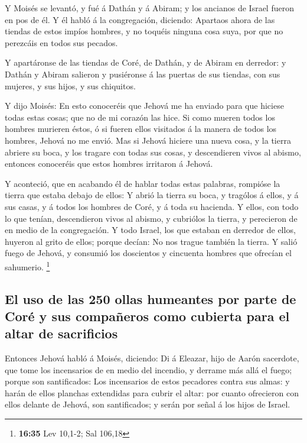  Y Moisés se levantó, y fué á Dathán y á Abiram; y los
ancianos de Israel fueron en pos de él.  Y él habló á la
congregación, diciendo: Apartaos ahora de las tiendas de estos impíos
hombres, y no toquéis ninguna cosa suya, por que no perezcáis en todos
sus pecados.

 Y apartáronse de las tiendas de Coré, de Dathán, y de
Abiram en derredor: y Dathán y Abiram salieron y pusiéronse á las
puertas de sus tiendas, con sus mujeres, y sus hijos, y sus chiquitos.

 Y dijo Moisés: En esto conoceréis que Jehová me ha enviado
para que hiciese todas estas cosas; que no de mi corazón las hice.
 Si como mueren todos los hombres murieren éstos, ó si
fueren ellos visitados á la manera de todos los hombres, Jehová no me
envió.  Mas si Jehová hiciere una nueva cosa, y la tierra
abriere su boca, y los tragare con todas sus cosas, y descendieren vivos
al abismo, entonces conoceréis que estos hombres irritaron á Jehová.

 Y aconteció, que en acabando él de hablar todas estas
palabras, rompióse la tierra que estaba debajo de ellos:  Y
abrió la tierra su boca, y tragólos á ellos, y á sus casas, y á todos
los hombres de Coré, y á toda su hacienda.  Y ellos, con
todo lo que tenían, descendieron vivos al abismo, y cubriólos la tierra,
y perecieron de en medio de la congregación.  Y todo
Israel, los que estaban en derredor de ellos, huyeron al grito de ellos;
porque decían: No nos trague también la tierra.  Y salió
fuego de Jehová, y consumió los doscientos y cincuenta hombres que
ofrecían el sahumerio. \footnote{\textbf{16:35} Lev 10,1-2; Sal 106,18}

\hypertarget{el-uso-de-las-250-ollas-humeantes-por-parte-de-coruxe9-y-sus-compauxf1eros-como-cubierta-para-el-altar-de-sacrificios}{%
\subsection{El uso de las 250 ollas humeantes por parte de Coré y sus
compañeros como cubierta para el altar de
sacrificios}\label{el-uso-de-las-250-ollas-humeantes-por-parte-de-coruxe9-y-sus-compauxf1eros-como-cubierta-para-el-altar-de-sacrificios}}

 Entonces Jehová habló á Moisés, diciendo:  Di
á Eleazar, hijo de Aarón sacerdote, que tome los incensarios de en medio
del incendio, y derrame más allá el fuego; porque son santificados:
 Los incensarios de estos pecadores contra sus almas: y
harán de ellos planchas extendidas para cubrir el altar: por cuanto
ofrecieron con ellos delante de Jehová, son santificados; y serán por
señal á los hijos de Israel.

